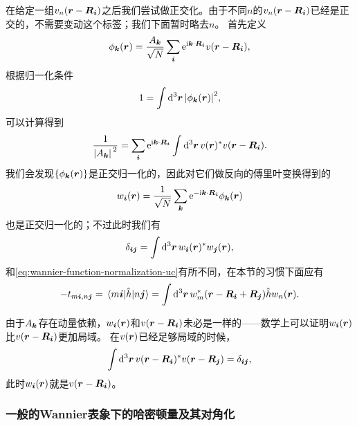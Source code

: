 在给定一组$v_n(\vb*{r} - \vb*{R}_{\vb*{i}})$之后我们尝试做正交化。由于不同$n$的$v_{n}(\vb*{r} - \vb*{R}_{\vb*{i}})$已经是正交的，不需要变动这个标签；我们下面暂时略去$n$。
首先定义
\begin{equation}
    \phi_{\vb*{k}}(\vb*{r}) = \frac{A_{\vb*{k}}}{\sqrt{N}} \sum_{\vb*{i}} \mathrm{e}^{\mathrm{i} \vb*{k} \cdot \vb*{R}_{\vb*{i}}} v(\vb*{r} - \vb*{R}_{\vb*{i}}),
\end{equation}
根据归一化条件
\[
    1 = \int \dd[3]{\vb*{r}} \abs{\phi_{\vb*{k}}(\vb*{r})}^2,
\]
可以计算得到
\begin{equation}
    \frac{1}{\abs*{A_{\vb*{k}}}^2} = \sum_{\vb*{i}} \mathrm{e}^{\mathrm{i} \vb*{k} \cdot \vb*{R}_{\vb*{i}}} \int \dd[3]{\vb*{r}} v(\vb*{r})^* v(\vb*{r} - \vb*{R}_{\vb*{i}}).
\end{equation}
我们会发现$\{\phi_{\vb*{k}}(\vb*{r})\}$是正交归一化的，因此对它们做反向的傅里叶变换得到的
\begin{equation}
    w_{\vb*{i}}(\vb*{r}) = \frac{1}{\sqrt{N}} \sum_{\vb*{k}} \mathrm{e}^{- \mathrm{i} \vb*{k} \cdot \vb*{R}_{\vb*{i}}} \phi_{\vb*{k}}(\vb*{r}) 
\end{equation}
也是正交归一化的；不过此时我们有
\begin{equation}
    \delta_{\vb*{i} \vb*{j}} = \int \dd[3]{\vb*{r}} w_{\vb*{i}}(\vb*{r})^* w_{\vb*{j}}(\vb*{r}),
\end{equation}
和\eqref{eq:wannier-function-normalization-uc}有所不同，在本节的习惯下面应有
\begin{equation}
    - t_{m\vb*{i}, n\vb*{j}} = \mel{m\vb*{i}}{\hat{h}}{n\vb*{j}} = \int \dd[3]{\vb*{r}} w_m^*(\vb*{r} - \vb*{R}_{\vb*{i}} + \vb*{R}_{\vb*{j}}) \hat{h} w_n(\vb*{r}).
\end{equation}

由于$A_{\vb*{k}}$存在动量依赖，$w_{\vb*{i}}(\vb*{r})$和$v(\vb*{r} - \vb*{R}_{\vb*{i}})$未必是一样的——数学上可以证明$w_{\vb*{i}}(\vb*{r})$比$v(\vb*{r} - \vb*{R}_{\vb*{i}})$更加局域。
在$v(\vb*{r})$已经足够局域的时候，
\begin{equation}
    \int \dd[3]{\vb*{r}} v(\vb*{r} - \vb*{R}_{\vb*{i}})^* v(\vb*{r} - \vb*{R}_{\vb*{j}}) = \delta_{\vb*{i} \vb*{j}},
\end{equation}
此时$w_{\vb*{i}}(\vb*{r})$就是$v(\vb*{r} - \vb*{R}_{\vb*{i}})$。

\subsubsection{一般的Wannier表象下的哈密顿量及其对角化} 

